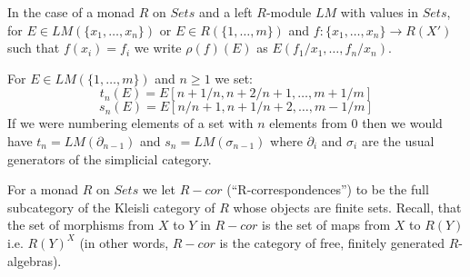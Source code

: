 \documentclass[11pt]{article}
\newcommand{\sr}{\rightarrow}
\begin{document}
In the case of a monad $R$ on $Sets$ and a left $R$-module $LM$ with values in $Sets$, for $E\in LM(\{x_1,\dots,x_n\})$ or $E\in R(\{1,\dots,m\})$  and $f:\{x_1,\dots,x_n\}\sr R(X')$ such that $f(x_i)=f_i$ we write $\rho(f)(E)$ as $E(f_1/x_1,\dots,f_n/x_n)$. 

For $E\in LM(\{1,\dots,m\})$ and $n\ge 1$ we set:
%
$$t_n(E)=E[n+1/n,n+2/n+1,\dots,m+1/m]$$
$$s_n(E)=E[n/n+1,n+1/n+2,\dots,m-1/m]$$
%
If we were numbering elements of a set with $n$ elements from $0$ then we would have $t_n=LM(\partial_{n-1})$ and $s_n=LM(\sigma_{n-1})$ where $\partial_i$ and $\sigma_i$ are the usual generators of the simplicial category. 

%
For a monad $R$ on $Sets$ we let $R-cor$ (``R-correspondences'') to be the full subcategory of the Kleisli category of $R$ whose objects are finite sets. Recall, that the set of morphisms from $X$ to $Y$ in $R-cor$ is the set of maps from $X$ to $R(Y)$ i.e. $R(Y)^X$ (in other words, $R-cor$ is the 
category of free, finitely generated $R$-algebras).   
\end{document}
